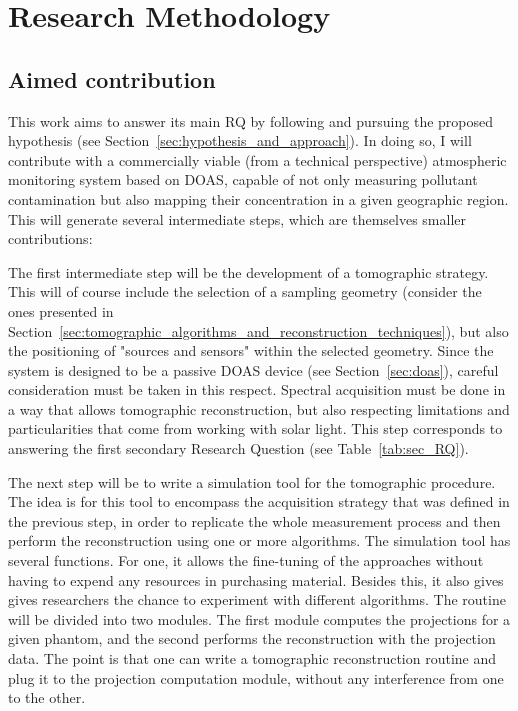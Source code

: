 \chapter{Research Methodology}
\label{cha:methodology}

\section{Aimed contribution}%
\label{sec:aimed_contribution}

This work aims to answer its main \gls{RQ} by following and pursuing the
proposed hypothesis (see Section~\ref{sec:hypothesis_and_approach}). In
doing so, I will contribute with a commercially viable (from a technical
perspective) atmospheric monitoring system based on DOAS, capable of not
only measuring pollutant contamination but also mapping their
concentration in a given geographic region. This will generate several
intermediate steps, which are themselves smaller contributions:

The first intermediate step will be the development of a tomographic
strategy. This will of course include the selection of a sampling
geometry (consider the ones presented in
Section~\ref{sec:tomographic_algorithms_and_reconstruction_techniques}),
but also the positioning of "sources and sensors" within the selected
geometry. Since the system is designed to be a passive DOAS device (see
Section~\ref{sec:doas}), careful consideration must be taken in this
respect. Spectral acquisition must be done in a way that allows
tomographic reconstruction, but also respecting limitations and
particularities that come from working with solar light. This step
corresponds to answering the first secondary Research Question (see
Table~\ref{tab:sec_RQ}).

The next step will be to write a simulation tool for the tomographic
procedure. The idea is for this tool to encompass the acquisition
strategy that was defined in the previous step, in order to replicate
the whole measurement process and then perform the reconstruction using
one or more algorithms. The simulation tool has several functions. For
one, it allows the fine-tuning of the approaches without having to
expend any resources in purchasing material. Besides this, it also gives
gives researchers the chance to experiment with different algorithms.
The routine will be divided into two modules. The first module computes
the projections for a given phantom, and the second performs the
reconstruction with the projection data. The point is that one can write
a tomographic reconstruction routine and plug it to the projection
computation module, without any interference from one to the other. 

